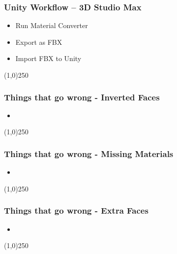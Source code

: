 \begin{frame}
\frametitle{Unity Workflow -- 3D Studio Max}
\begin{itemize}
	\item Run Material Converter
	\item Export as FBX
	\item Import FBX to Unity
\end{itemize}
\end{frame}
\begin{center}\line(1,0){250}\end{center}





\begin{frame}
\frametitle{Things that go wrong - Inverted Faces }
\begin{figure}
	\centering
	\caption[]{}
	\label{fig:}
\end{figure}
\begin{itemize}
	\item 
\end{itemize}
\end{frame}
\begin{center}\line(1,0){250}\end{center}


\begin{frame}
\frametitle{Things that go wrong - Missing Materials}
\begin{figure}
	\centering
	\caption[]{}
	\label{fig:}
\end{figure}
\begin{itemize}
	\item 
\end{itemize}
\end{frame}
\begin{center}\line(1,0){250}\end{center}



\begin{frame}
\frametitle{Things that go wrong - Extra Faces}
\begin{figure}
	\centering
	\caption[]{}
	\label{fig:}
\end{figure}
\begin{itemize}
	\item 
\end{itemize}
\end{frame}
\begin{center}\line(1,0){250}\end{center}


